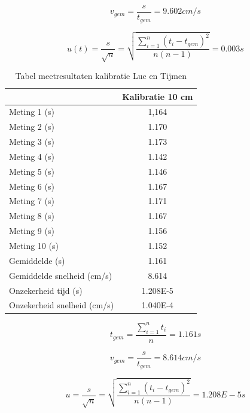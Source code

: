 \documentclass{report}
\begin{document}
$$ v_{gem} = \frac{s}{t_{gem}} = 9.602 cm/s$$

$$ u(t) = \frac{s}{\sqrt{n}} = \sqrt{\frac{\sum_{i=1}^{n}( t_i-t_{gem})^2}{n(n-1)}} = 0.003 s$$ 


\begin{table}
 \centering
\begin{tabular}{| l| c|}
\hline
    & Kalibratie 10 cm \\
\hline
   Meting 1 (s) & 1,164 \\
\hline
   Meting 2 (s) & 1.170 \\
\hline
   Meting 3 (s) & 1.173 \\
\hline
   Meting 4 (s) & 1.142 \\
\hline
   Meting 5 (s) & 1.146 \\
\hline
   Meting 6 (s) & 1.167 \\
\hline
   Meting 7 (s) & 1.171 \\
\hline
   Meting 8 (s) & 1.167 \\
\hline
   Meting 9 (s) & 1.156 \\
\hline
   Meting 10 (s) & 1.152 \\
\hline
   Gemiddelde (s) & 1.161 \\
\hline
   Gemiddelde snelheid (cm/s) & 8.614 \\
\hline
   Onzekerheid tijd (s) & 1.208E-5
 \\
\hline
   Onzekerheid snelheid (cm/s) & 1.040E-4 \\
\hline
\end{tabular}
\caption{Tabel meetresultaten kalibratie Luc en Tijmen}
\end{table}

$$ t_{gem}=\frac{\sum_{i=1}^{n}t_i}{n} = 1.161 s$$

$$ v_{gem} = \frac{s}{t_{gem}} = 8.614 cm/s$$

$$ u = \frac{s}{\sqrt{n}} = \sqrt{\frac{\sum_{i=1}^{n}( t_i-t_{gem})^2}{n(n-1)}} = 1.208E-5 s$$
\end{document}
